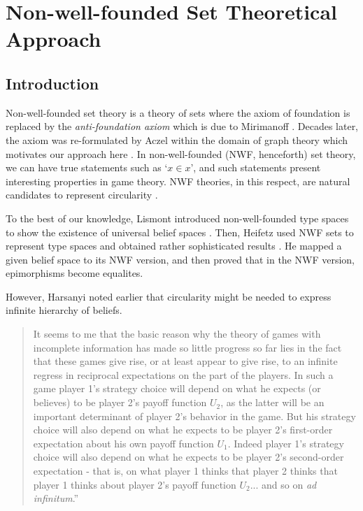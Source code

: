 \documentclass{article}
\begin{document}
\section{Non-well-founded Set Theoretical Approach}

\subsection{Introduction}

Non-well-founded set theory is a theory of sets where the axiom of foundation is replaced by the \emph{anti-foundation axiom} which is due to Mirimanoff \cite{mir}. Decades later, the axiom was re-formulated by Aczel within the domain of graph theory which motivates our approach here \cite{acz}. In non-well-founded (NWF, henceforth) set theory, we can have true statements such as `$x \in x$', and such statements present interesting properties in game theory. NWF theories, in this respect, are natural candidates to represent circularity \cite{bar1}. 

To the best of our knowledge, Lismont introduced non-well-founded type spaces to show the existence of universal belief spaces \cite{lis}. Then, Heifetz used NWF sets to represent type spaces and obtained  rather sophisticated results \cite{heif}. He mapped a given belief space to its NWF version, and then proved that in the NWF version, epimorphisms become equalites.

However, Harsanyi noted earlier that circularity might be needed to express infinite hierarchy of beliefs.

\begin{quote}
It seems to me that the basic reason why the theory of games with incomplete information has made so little progress so far lies in the fact that these games give rise, or at least appear to give rise, to an infinite regress in reciprocal expectations on the part of the players. In such a game player 1's strategy choice will depend on what he expects (or believes) to be player 2's payoff function $U_2$, as the latter will be an important determinant of player 2's behavior in the game. But his strategy choice will also depend on what he expects to be player 2's first-order expectation about his own payoff function $U_1$. Indeed player 1's strategy choice will also depend on what he expects to be player 2's second-order expectation - that is, on what player 1 thinks that player 2 thinks that player 1 thinks about player 2's payoff function $U_2$... and so on \emph{ad infinitum}.”

\cite{hars}
\end{quote}
\end{document}
